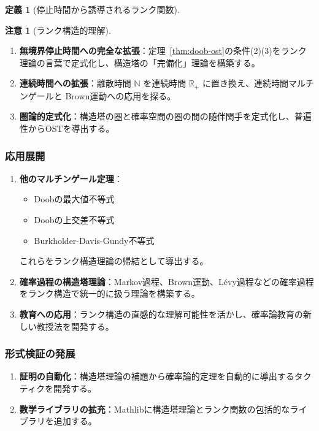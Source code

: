 \documentclass[a4paper,11pt]{ltjsarticle}
\theoremstyle{definition}
\newtheorem{definition}[theorem]{定義}
\newtheorem{remark}[theorem]{注意}
\newcommand{\N}{\mathbb{N}}
\newcommand{\R}{\mathbb{R}}
\begin{document}
\begin{definition}[停止時間から誘導されるランク関数]
\begin{remark}[ランク構造的理解]
\begin{enumerate}
\item \textbf{無境界停止時間への完全な拡張}：定理~\ref{thm:doob-ost}の条件(2)(3)をランク理論の言葉で定式化し、構造塔の「完備化」理論を構築する。

\item \textbf{連続時間への拡張}：離散時間 $\N$ を連続時間 $\R_+$ に置き換え、連続時間マルチンゲールと Brown運動への応用を探る。

\item \textbf{圏論的定式化}：構造塔の圏と確率空間の圏の間の随伴関手を定式化し、普遍性からOSTを導出する。
\end{enumerate}

\subsubsection{応用展開}

\begin{enumerate}
\item \textbf{他のマルチンゲール定理}：
\begin{itemize}
\item Doobの最大値不等式
\item Doobの上交差不等式
\item Burkholder-Davis-Gundy不等式
\end{itemize}
これらをランク構造理論の帰結として導出する。

\item \textbf{確率過程の構造塔理論}：Markov過程、Brown運動、Lévy過程などの確率過程をランク構造で統一的に扱う理論を構築する。

\item \textbf{教育への応用}：ランク構造の直感的な理解可能性を活かし、確率論教育の新しい教授法を開発する。
\end{enumerate}

\subsubsection{形式検証の発展}

\begin{enumerate}
\item \textbf{証明の自動化}：構造塔理論の補題から確率論的定理を自動的に導出するタクティクを開発する。

\item \textbf{数学ライブラリの拡充}：Mathlibに構造塔理論とランク関数の包括的なライブラリを追加する。


\end{enumerate}
\end{remark}
\end{definition}
\end{document}
